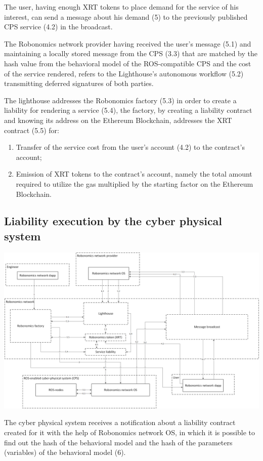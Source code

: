 \documentclass{article}
\begin{document}
The user, having enough XRT tokens to place demand for the service of his interest, can send a message about his demand (5) to the previously published CPS service (4.2) in the broadcast.

The Robonomics network provider having received the user's message (5.1) and maintaining a locally stored message from the CPS (3.3) that are matched by the hash value from the behavioral model of the ROS-compatible CPS and the cost of the service rendered, refers to the Lighthouse’s autonomous workflow (5.2) transmitting deferred signatures of both parties.

The lighthouse addresses the Robonomics factory (5.3) in order to create a liability for rendering a service (5.4), the factory, by creating a liability contract and knowing its address on the Ethereum Blockchain, addresses the XRT contract  (5.5) for:
\begin{enumerate}
	\item Transfer of the service cost from the user's account (4.2) to the contract’s account;
	\item Emission of XRT tokens to the contract’s account, namely the total amount required to utilize the gas multiplied by the starting factor on the Ethereum Blockchain.
\end{enumerate}

\subsection{Liability execution by the cyber physical system}

\includegraphics[width=1\textwidth]{step-by-step-6.png} 

The cyber physical system receives a notification about a liability contract created for it with the help of Robonomics network OS, in which it is possible to find out the hash of the behavioral model and the hash of the parameters (variables) of the behavioral model (6).
\end{document}
